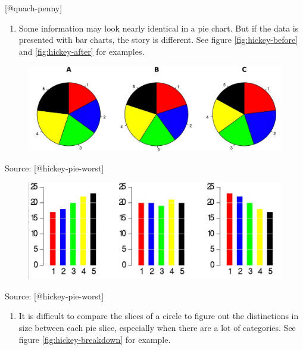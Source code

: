 \documentclass[]{book}
\providecommand{\tightlist}{%
  \setlength{\itemsep}{0pt}\setlength{\parskip}{0pt}}
\theoremstyle{definition}
\theoremstyle{definition}
\theoremstyle{definition}
\theoremstyle{remark}
\begin{document}
{[}@quach-penny{]}

\begin{enumerate}
\def\labelenumi{\arabic{enumi}.}
\tightlist
\item
  Some information may look nearly identical in a pie chart. But if the
  data is presented with bar charts, the story is different. See figure
  \ref{fig:hickey-before} and \ref{fig:hickey-after} for examples.
\end{enumerate}

\begin{figure}
\centering
\includegraphics{images/hickey-before.jpg}
\caption{}
\end{figure}

Source: {[}@hickey-pie-worst{]}

\begin{figure}
\centering
\includegraphics{images/hickey-after.jpg}
\caption{}
\end{figure}

Source: {[}@hickey-pie-worst{]}

\begin{enumerate}
\def\labelenumi{\arabic{enumi}.}
\setcounter{enumi}{1}
\tightlist
\item
  It is difficult to compare the slices of a circle to figure out the
  distinctions in size between each pie slice, especially when there are
  a lot of categories. See figure \ref{fig:hickey-breakdown} for
  example.
\end{enumerate}
\end{document}
